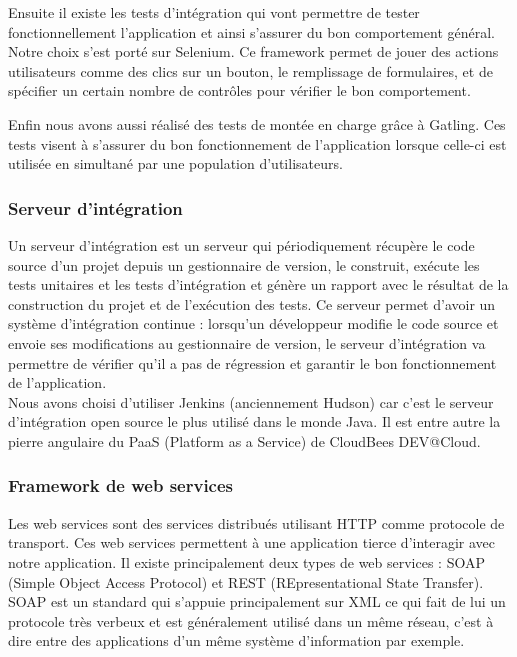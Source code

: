Ensuite il existe les tests d'intégration qui vont permettre de tester fonctionnellement l'application et ainsi s'assurer du bon comportement général. Notre choix s'est porté sur Selenium. Ce framework permet de jouer des actions utilisateurs comme des clics sur un bouton, le remplissage de formulaires, et de spécifier un certain nombre de contrôles pour vérifier le bon comportement.

Enfin nous avons aussi réalisé des tests de montée en charge grâce à Gatling. Ces tests visent à s'assurer du bon fonctionnement de l'application lorsque celle-ci est utilisée en simultané par une population d'utilisateurs.

\subsubsection{Serveur d'intégration}

Un serveur d'intégration est un serveur qui périodiquement récupère le code source d'un projet depuis un gestionnaire de version, le construit, exécute les tests unitaires et les tests d'intégration et génère un rapport avec le résultat de la construction du projet et de l'exécution des tests. Ce serveur permet d'avoir un système d'intégration continue : lorsqu'un développeur modifie le code source et envoie ses modifications au gestionnaire de version, le serveur d'intégration va permettre de vérifier qu'il a pas de régression et garantir le bon fonctionnement de l'application.\\

Nous avons choisi d'utiliser Jenkins (anciennement Hudson) car c'est le serveur d'intégration open source le plus utilisé dans le monde Java. Il est entre autre la pierre angulaire du PaaS (Platform as a Service) de CloudBees DEV@Cloud.

\subsubsection{Framework de web services}

Les web services sont des services distribués utilisant HTTP comme protocole de transport. Ces web services permettent à une application tierce d'interagir avec notre application. Il existe principalement deux types de web services : SOAP (Simple Object Access Protocol) et REST (REpresentational State Transfer).\\

SOAP est un standard qui s'appuie principalement sur XML ce qui fait de lui un protocole très verbeux et est généralement utilisé dans un même réseau, c'est à dire entre des applications d'un même système d'information par exemple.\\

